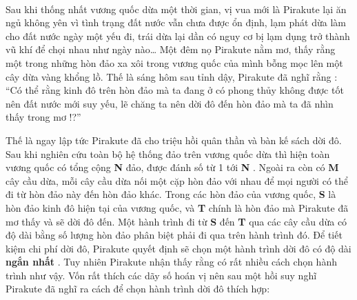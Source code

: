  

Sau khi thống nhất vương quốc dừa một thời gian, vị vua mới là Pirakute lại ăn ngủ không yên vì tình trạng đất nước vẫn chưa được ổn định, lạm phát dừa làm cho đất nước ngày một yếu đi, trái dừa lại dần có nguy cơ bị lạm dụng trở thành vũ khí để chọi nhau như ngày nào… Một đêm nọ Pirakute nằm mơ, thấy rằng một trong những hòn đảo xa xôi trong vương quốc của mình bỗng mọc lên một cây dừa vàng khổng lồ. Thế là sáng hôm sau tỉnh dậy, Pirakute đã nghĩ rằng : “Có thể rằng kinh đô trên hòn đảo mà ta đang ở có phong thủy không được tốt nên đất nước mới suy yếu, lẽ chăng ta nên dời đô đến hòn đảo mà ta đã nhìn thấy trong mơ !?”

Thế là ngay lập tức Pirakute đã cho triệu hồi quân thần và bàn kế sách dời đô. Sau khi nghiên cứu toàn bộ hệ thống đảo trên vương quốc dừa thì hiện toàn vương quốc có tổng cộng \textbf{ N } đảo, được đánh số từ 1 tới \textbf{ N } . Ngoài ra còn có \textbf{ M } cây cầu dừa, mỗi cây cầu dừa nối một cặp hòn đảo với nhau để mọi người có thể đi từ hòn đảo này đến hòn đảo khác. Trong các hòn đảo của vương quốc, \textbf{ S } là hòn đảo kinh đô hiện tại của vương quốc, và \textbf{ T } chính là hòn đảo mà Pirakute đã mơ thấy và sẽ dời đô đến. Một hành trình đi từ \textbf{ S } đến \textbf{ T } qua các cây cầu dừa có độ dài bằng số lượng hòn đảo phân biệt phải đi qua trên hành trình đó. Để tiết kiệm chi phí dời đô, Pirakute quyết định sẽ chọn một hành trình dời đô có độ dài \textbf{ ngắn nhất } . Tuy nhiên Pirakute nhận thấy rằng có rất nhiều cách chọn hành trình như vậy. Vốn rất thích các dãy số hoán vị nên sau một hồi suy nghĩ Pirakute đã nghĩ ra cách để chọn hành trình dời đô thích hợp:
